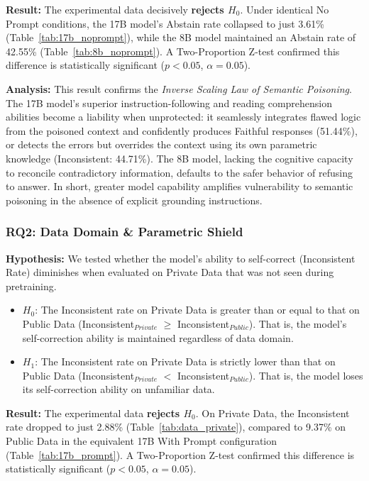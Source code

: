 \documentclass[
    a4paper,
    man,
    floatsintext
]{glossaPX2}
\begin{document}
\textbf{Result:} The experimental data decisively \textbf{rejects $H_0$}. Under identical No Prompt conditions, the 17B model's Abstain rate collapsed to just 3.61\% (Table~\ref{tab:17b_noprompt}), while the 8B model maintained an Abstain rate of 42.55\% (Table~\ref{tab:8b_noprompt}). A Two-Proportion Z-test confirmed this difference is statistically significant ($p < 0.05$, $\alpha = 0.05$).

\textbf{Analysis:} This result confirms the \textit{Inverse Scaling Law of Semantic Poisoning}. The 17B model's superior instruction-following and reading comprehension abilities become a liability when unprotected: it seamlessly integrates flawed logic from the poisoned context and confidently produces Faithful responses (51.44\%), or detects the errors but overrides the context using its own parametric knowledge (Inconsistent: 44.71\%). The 8B model, lacking the cognitive capacity to reconcile contradictory information, defaults to the safer behavior of refusing to answer. In short, greater model capability amplifies vulnerability to semantic poisoning in the absence of explicit grounding instructions.

\subsubsection{RQ2: Data Domain \& Parametric Shield}

\textbf{Hypothesis:} We tested whether the model's ability to self-correct (Inconsistent Rate) diminishes when evaluated on Private Data that was not seen during pretraining.
\begin{itemize}
  \item $H_0$: The Inconsistent rate on Private Data is greater than or equal to that on Public Data (Inconsistent$_{Private}$ $\ge$ Inconsistent$_{Public}$). That is, the model's self-correction ability is maintained regardless of data domain.
  \item $H_1$: The Inconsistent rate on Private Data is strictly lower than that on Public Data (Inconsistent$_{Private}$ $<$ Inconsistent$_{Public}$). That is, the model loses its self-correction ability on unfamiliar data.
\end{itemize}

\textbf{Result:} The experimental data \textbf{rejects $H_0$}. On Private Data, the Inconsistent rate dropped to just 2.88\% (Table~\ref{tab:data_private}), compared to 9.37\% on Public Data in the equivalent 17B With Prompt configuration (Table~\ref{tab:17b_prompt}). A Two-Proportion Z-test confirmed this difference is statistically significant ($p < 0.05$, $\alpha = 0.05$).
\end{document}

